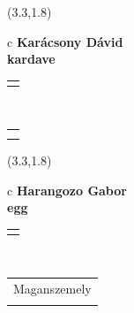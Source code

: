 \documentclass[11pt]{article}
\begin{document}
\makebox(3.3,1.8){
  \renewcommand\arraystretch{1.3}
  \begin{tabular}[c]{c}
    \hspace{8.5mm}
    \LARGE\bf{ Karácsony Dávid }\\
    \hspace{8.5mm}
    \Large{ kardave }\\
    \renewcommand\arraystretch{3}
    \begin{tabular}[c]{c}
      \centering
      \fontfamily{phv}\selectfont{
        \textbf{
          \textsc{
            \scriptsize{
            \color{Bright}{ Ismerkedő }\color{Dark}{ Webmester }\color{Bright}{ Sminkmester }\color{Bright}{ Programozó }
            }
          }
        }
      }
    \end{tabular}
    \\
    \renewcommand\arraystretch{1}
    \begin{tabular}{p{3.3in}}
      \hspace{.7cm}\\
      \hspace{.7cm}\emph{  }\\
    \end{tabular}
  \end{tabular}
}

\makebox(3.3,1.8){
  \renewcommand\arraystretch{1.3}
  \begin{tabular}[c]{c}
    \hspace{8.5mm}
    \LARGE\bf{ Harangozo Gabor }\\
    \hspace{8.5mm}
    \Large{ egg }\\
    \renewcommand\arraystretch{3}
    \begin{tabular}[c]{c}
      \centering
      \fontfamily{phv}\selectfont{
        \textbf{
          \textsc{
            \scriptsize{
            \color{Dark}{ Ismerkedő }\color{Dark}{ Webmester }\color{Bright}{ Sminkmester }\color{Bright}{ Programozó }
            }
          }
        }
      }
    \end{tabular}
    \\
    \renewcommand\arraystretch{1}
    \begin{tabular}{p{3.3in}}
      \hspace{.7cm}Maganszemely\\
      \hspace{.7cm}\emph{  }\\
    \end{tabular}
  \end{tabular}
}
\end{document}
